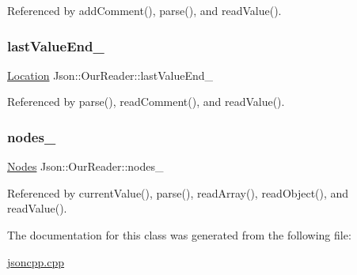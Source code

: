 Referenced by add\+Comment(), parse(), and read\+Value().

\mbox{\label{classJson_1_1OurReader_a101eadc45e01c60628b53f0db3d13482_a101eadc45e01c60628b53f0db3d13482}} 
\subsubsection{\texorpdfstring{last\+Value\+End\+\_\+}{lastValueEnd\_}}
{\footnotesize\ttfamily \hyperlink{classJson_1_1OurReader_a1bdc7bbc52ba87cae6b19746f2ee0189_a1bdc7bbc52ba87cae6b19746f2ee0189}{Location} Json\+::\+Our\+Reader\+::last\+Value\+End\+\_\+\hspace{0.3cm}{\ttfamily [private]}}



Referenced by parse(), read\+Comment(), and read\+Value().

\mbox{\label{classJson_1_1OurReader_a19cc4e8c5d17ee6822f752e9a36f4ce3_a19cc4e8c5d17ee6822f752e9a36f4ce3}} 
\subsubsection{\texorpdfstring{nodes\+\_\+}{nodes\_}}
{\footnotesize\ttfamily \hyperlink{classJson_1_1OurReader_a8480a5ef159cee3a090f96358414d8d3_a8480a5ef159cee3a090f96358414d8d3}{Nodes} Json\+::\+Our\+Reader\+::nodes\+\_\+\hspace{0.3cm}{\ttfamily [private]}}



Referenced by current\+Value(), parse(), read\+Array(), read\+Object(), and read\+Value().



The documentation for this class was generated from the following file\+:\begin{DoxyCompactItemize}
\item 
\hyperlink{jsoncpp_8cpp}{jsoncpp.\+cpp}\end{DoxyCompactItemize}
